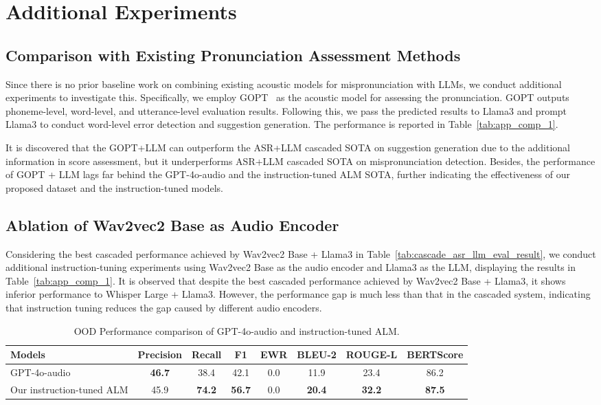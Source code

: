 \documentclass[11pt]{article}
\begin{document}
\section{Additional Experiments}
\subsection{Comparison with Existing Pronunciation Assessment Methods}
\label{sec:comp_gopt}
Since there is no prior baseline work on combining existing acoustic models for mispronunciation with LLMs, we conduct additional experiments to investigate this. Specifically, we employ GOPT~\citep{gopt} as the acoustic model for assessing the pronunciation. GOPT outputs phoneme-level, word-level, and utterance-level evaluation results. Following this, we pass the predicted results to Llama3 and prompt Llama3 to conduct word-level error detection and suggestion generation. The performance is reported in Table~\ref{tab:app_comp_1}.



It is discovered that the GOPT+LLM can outperform the ASR+LLM cascaded SOTA on suggestion generation due to the additional information in score assessment, but it underperforms ASR+LLM cascaded SOTA on mispronunciation detection. Besides, the performance of GOPT + LLM lags far behind the GPT-4o-audio and the instruction-tuned ALM SOTA, further indicating the effectiveness of our proposed dataset and the instruction-tuned models.


\subsection{Ablation of Wav2vec2 Base as Audio Encoder}
Considering the best cascaded performance achieved by Wav2vec2 Base + Llama3 in Table~\ref{tab:cascade_asr_llm_eval_result}, we conduct additional instruction-tuning experiments using Wav2vec2 Base as the audio encoder and Llama3 as the LLM, displaying the results in Table~\ref{tab:app_comp_1}. It is observed that despite the best cascaded performance achieved by Wav2vec2 Base + Llama3, it shows inferior performance to Whisper Large + Llama3. However, the performance gap is much less than that in the cascaded system, indicating that instruction tuning reduces the gap caused by different audio encoders.

\begin{table}[t]
\centering
\small
\begin{tabular}{lccccccc}
\toprule
\textbf{Models} & \textbf{Precision} & \textbf{Recall} & \textbf{F1} & \textbf{EWR} & \textbf{BLEU-2} & \textbf{ROUGE-L} & \textbf{BERTScore} \\
\midrule
GPT-4o-audio & \textbf{46.7} & 38.4 & 42.1 & 0.0 & 11.9 & 23.4 & 86.2 \\
Our instruction-tuned ALM & 45.9 & \textbf{74.2} & \textbf{56.7} & 0.0 & \textbf{20.4} & \textbf{32.2} & \textbf{87.5} \\
\bottomrule
\end{tabular}
\caption{OOD Performance comparison of GPT-4o-audio and instruction-tuned ALM.}
\label{tab:audio_model_comparison}
\end{table}
\end{document}
